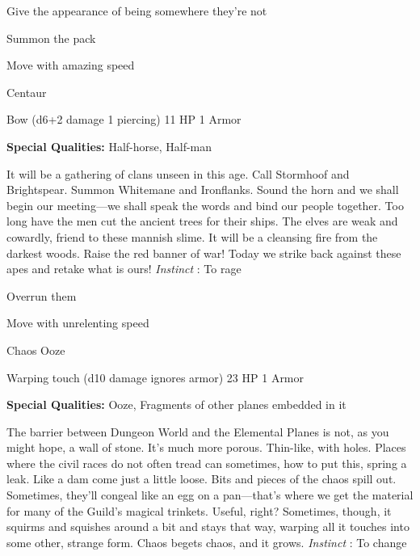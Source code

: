 \startitemize[1,packed]

\item Give the appearance of being somewhere they're not

 
\item Summon the pack

 
\item Move with amazing speed


\stopitemize
 
\startMonsterName
Centaur	 
\stopMonsterName
 

Bow (d6+2 damage 1 piercing)	11 HP	1 Armor

 


 
\startMonsterQualities
{\bf Special Qualities:}  Half-horse, Half-man
\stopMonsterQualities
 
\startMonsterDescription
It will be a gathering of clans unseen in this age. Call Stormhoof and Brightspear. Summon Whitemane and Ironflanks. Sound the horn and we shall begin our meeting—we shall speak the words and bind our people together. Too long have the men cut the ancient trees for their ships. The elves are weak and cowardly, friend to these mannish slime. It will be a cleansing fire from the darkest woods. Raise the red banner of war! Today we strike back against these apes and retake what is ours! {\em Instinct} : To rage
\stopMonsterDescription
 
\startitemize[1,packed]

\item Overrun them

 
\item Move with unrelenting speed


\stopitemize
 
\startMonsterName
Chaos Ooze	 
\stopMonsterName
 

Warping touch (d10 damage ignores armor)	23 HP	1 Armor

 


 
\startMonsterQualities
{\bf Special Qualities:}  Ooze, Fragments of other planes embedded in it
\stopMonsterQualities
 
\startMonsterDescription
The barrier between Dungeon World and the Elemental Planes is not, as you might hope, a wall of stone. It’s much more porous. Thin-like, with holes. Places where the civil races do not often tread can sometimes, how to put this, spring a leak. Like a dam come just a little loose. Bits and pieces of the chaos spill out. Sometimes, they’ll congeal like an egg on a pan—that’s where we get the material for many of the Guild’s magical trinkets. Useful, right? Sometimes, though, it squirms and squishes around a bit and stays that way, warping all it touches into some other, strange form. Chaos begets chaos, and it grows. {\em Instinct} : To change
\stopMonsterDescription
 
